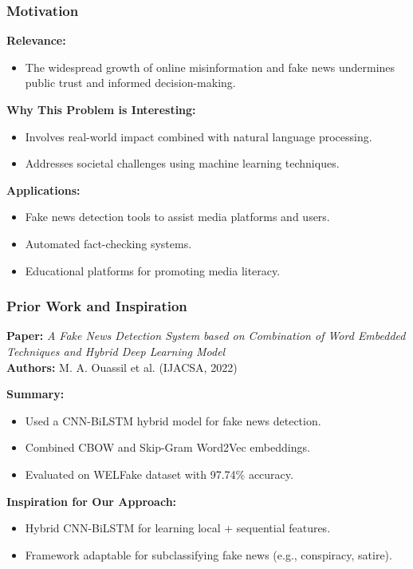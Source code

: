 \documentclass{beamer}
\begin{document}
\begin{frame}
    \frametitle{Motivation}
    
    \vspace{0.5em}
    \textbf{Relevance:}
    \begin{itemize}
        \item The widespread growth of online misinformation and fake news undermines public trust and informed decision-making.
    \end{itemize}
    
    \vspace{1em}
    \textbf{Why This Problem is Interesting:}
    \begin{itemize}
        \item Involves real-world impact combined with natural language processing.
        \item Addresses societal challenges using machine learning techniques.
    \end{itemize}
    
    \vspace{0.5em}
    \textbf{Applications:}
    \begin{itemize}
        \item Fake news detection tools to assist media platforms and users.
        \item Automated fact-checking systems.
        \item Educational platforms for promoting media literacy.
    \end{itemize}
    
\end{frame}
    
    
\begin{frame}
    \frametitle{Prior Work and Inspiration}
    
    \textbf{Paper:} \textit{A Fake News Detection System based on Combination of Word Embedded Techniques and Hybrid Deep Learning Model} \\
    \textbf{Authors:} M. A. Ouassil et al. (IJACSA, 2022)
    
    \vspace{0.2cm}
    \textbf{Summary:}
    \begin{itemize}
        \item Used a CNN-BiLSTM hybrid model for fake news detection.
        \item Combined CBOW and Skip-Gram Word2Vec embeddings.
        \item Evaluated on WELFake dataset with 97.74\% accuracy.
    \end{itemize}
    
    \vspace{0.2cm}
    \textbf{Inspiration for Our Approach:}
    \begin{itemize}
        \item Hybrid CNN-BiLSTM for learning local + sequential features.
        \item Framework adaptable for subclassifying fake news (e.g., conspiracy, satire).
    \end{itemize}
    
\end{frame}
    
\end{document}
